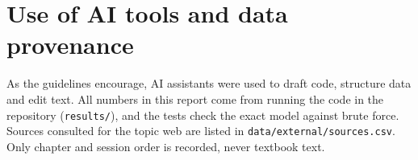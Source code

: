 \documentclass[11pt,a4paper]{article}
\begin{document}
\section{Use of AI tools and data provenance}
\label{app:ai}
As the guidelines encourage, AI assistants were used to draft code, structure data and edit text. All numbers in this report come from running the code in the repository (\texttt{results/}), and the tests check the exact model against brute force. Sources consulted for the topic web are listed in \texttt{data/external/sources.csv}. Only chapter and session order is recorded, never textbook text.
\end{document}
